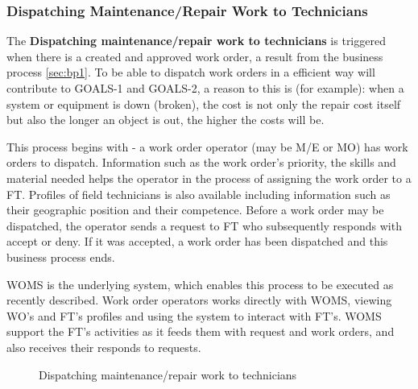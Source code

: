 \subsubsection{Dispatching Maintenance/Repair Work to Technicians}
\label{sec:bp3}
The \textbf{Dispatching maintenance/repair work to technicians} is triggered when there is a created and approved work order, a result from the business process \ref{sec:bp1}. To be able to dispatch work orders in a efficient way will contribute to GOALS-1 and GOALS-2, a reason to this is (for example): when a system or equipment is down (broken), the cost is not only the repair cost itself but also the longer an object is out, the higher the costs will be.

This process begins with - a work order operator (may be M/E or MO) has work orders to dispatch. Information such as the work order's priority, the skills and material needed helps the operator in the process of assigning the work order to a FT. Profiles of field technicians is also available including information such as their geographic position and their competence. Before a work order may be dispatched, the operator sends a request to FT who subsequently responds with accept or deny. If it was accepted, a work order has been dispatched and this business process ends.

WOMS is the underlying system, which enables this process to be executed as recently described. Work order operators works directly with WOMS, viewing WO's and FT's profiles and using the system to interact with FT's. WOMS support the FT's activities as it feeds them with request and work orders, and also receives their responds to requests.
\begin{figure}[H]
	\centering
	\setlength\fboxsep{7pt}
	\setlength\fboxrule{0.5pt}
	\label{fig:dispatch}
	\caption{Dispatching maintenance/repair work to technicians}
\end{figure}
%
